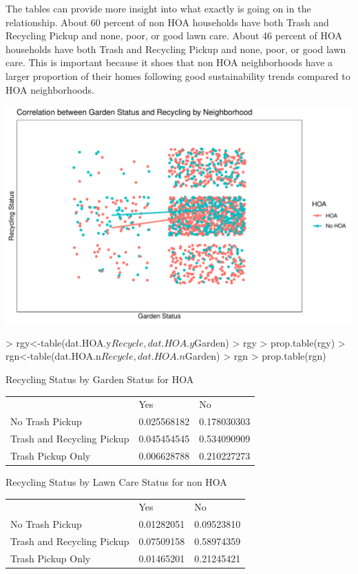 \documentclass{article}
\begin{document}
The tables can provide more insight into what exactly is going on in the relationship. About 60 percent of non HOA households have both Trash and Recycling Pickup and none, poor, or good lawn care. About 46 percent of HOA households have both Trash and Recycling Pickup and none, poor, or good lawn care. This is important because it shoes that non HOA neighborhoods have a larger proportion of their homes following good sustainability trends compared to HOA neighborhoods. 
\newpage

\includegraphics{exam1-014}
\newline
\begin{Schunk}
\begin{Sinput}
> rgy<-table(dat.HOA.y$Recycle,dat.HOA.y$Garden)
> rgy
> prop.table(rgy)
> rgn<-table(dat.HOA.n$Recycle,dat.HOA.n$Garden)
> rgn
> prop.table(rgn)
\end{Sinput}
\end{Schunk}

\begin{center} Recycling Status by Garden Status for HOA \end{center}
\begin{table}[H]
\begin{tabular}{lll}
                           & Yes         & No          \\
No Trash Pickup            & 0.025568182 & 0.178030303 \\
Trash and Recycling Pickup & 0.045454545 & 0.534090909 \\
Trash Pickup Only          & 0.006628788 & 0.210227273
\end{tabular}
\end{table}

\begin{center} Recycling Status by Lawn Care Status for non HOA \end{center}
\begin{table}[H]
\begin{tabular}{lll}
                           & Yes        & No         \\
No Trash Pickup            & 0.01282051 & 0.09523810 \\
Trash and Recycling Pickup & 0.07509158 & 0.58974359 \\
Trash Pickup Only          & 0.01465201 & 0.21245421
\end{tabular}
\end{table}
\end{document}
